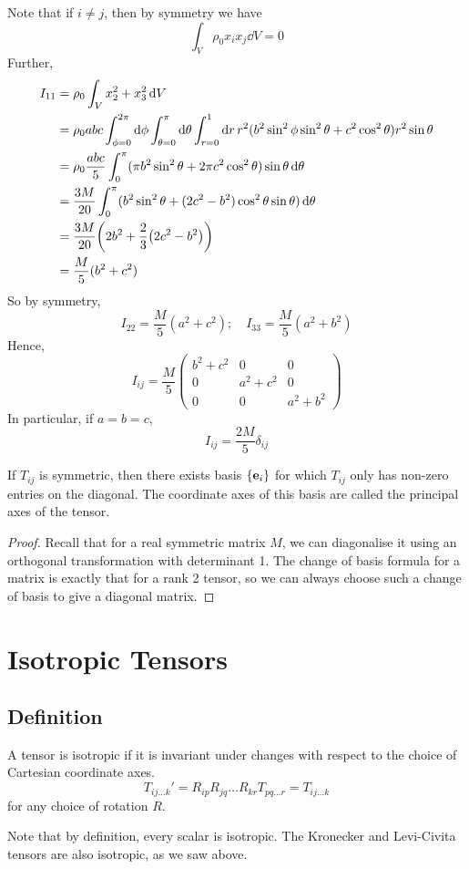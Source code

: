 \documentclass{article}
\begin{document}
Note that if $i \neq j$, then by symmetry we have
\[ \int_V \rho_0 x_i x_j \dd{V} = 0 \]
Further,
\begin{align*}
	I_{11} &= \rho_0 \int_V x_2^2 + x_3^2 \dd{V} \\
	&= \rho_0 abc \int_{\phi = 0}^{2\pi} \dd{\phi} \int_{\theta = 0}^\pi \dd{\theta} \int_{r = 0}^1 \dd{r} r^2 (b^2\sin^2\phi\sin^2\theta + c^2\cos^2\theta) r^2\sin\theta \\
	&= \rho_0 \frac{abc}{5} \int_0^\pi (\pi b^2 \sin^2 \theta + 2\pi c^2\cos^2\theta) \sin\theta \dd{\theta} \\
	&= \frac{3M}{20} \int_0^\pi (b^2 \sin^2 \theta + (2c^2 - b^2)\cos^2\theta\sin\theta) \dd{\theta} \\
	&= \frac{3M}{20} \qty(2b^2 + \frac{2}{3}\qty(2c^2 - b^2)) \\
	&= \frac{M}{5} (b^2 + c^2)
\end{align*}
So by symmetry,
\[ I_{22} = \frac{M}{5} (a^2 + c^2);\quad I_{33} = \frac{M}{5} (a^2 + b^2) \]
Hence,
\[ I_{ij} = \frac{M}{5} \begin{pmatrix}
	b^2 + c^2 & 0 & 0 \\
	0 & a^2 + c^2 & 0 \\
	0 & 0 & a^2 + b^2
\end{pmatrix} \]
In particular, if $a=b=c$,
\[ I_{ij} = \frac{2M}{5}\delta_{ij} \]
\begin{proposition}
	If $T_{ij}$ is symmetric, then there exists basis $\{ \vb e_i \}$ for which $T_{ij}$ only has non-zero entries on the diagonal. The coordinate axes of this basis are called the principal axes of the tensor.
\end{proposition}
\begin{proof}
	Recall that for a real symmetric matrix $M$, we can diagonalise it using an orthogonal transformation with determinant 1. The change of basis formula for a matrix is exactly that for a rank 2 tensor, so we can always choose such a change of basis to give a diagonal matrix.
\end{proof}

\section{Isotropic Tensors}
\subsection{Definition}
\begin{definition}
	A tensor is isotropic if it is invariant under changes with respect to the choice of Cartesian coordinate axes.
	\[ T_{ij\dots k}' = R_{ip} R_{jq} \dots R_{kr} T_{pq\dots r} = T_{ij\dots k} \]
	for any choice of rotation $R$.
\end{definition}
\noindent Note that by definition, every scalar is isotropic. The Kronecker and Levi-Civita tensors are also isotropic, as we saw above.
\end{document}
